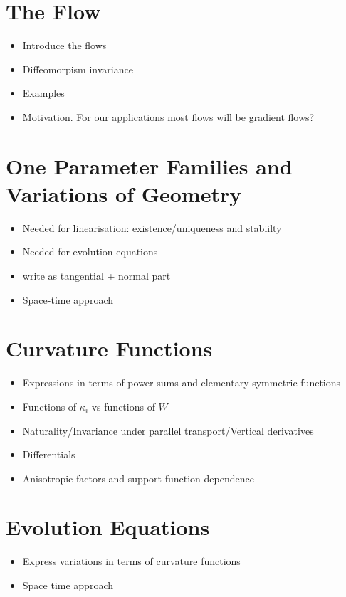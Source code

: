 \chapter{The Flow}

\begin{itemize}
\item Introduce the flows
\item Diffeomorpism invariance
\item Examples
\item Motivation. For our applications most flows will be gradient flows?
\end{itemize}

\chapter{One Parameter Families and Variations of Geometry}

\begin{itemize}
\item Needed for linearisation: existence/uniqueness and stabiilty
\item Needed for evolution equations
\item write as tangential + normal part
\item Space-time approach
\end{itemize}

\chapter{Curvature Functions}

\begin{itemize}
\item Expressions in terms of power sums and elementary symmetric functions
\item Functions of \(\kappa_i\) vs functions of \(W\)
\item Naturality/Invariance under parallel transport/Vertical derivatives
\item Differentials
\item Anisotropic factors and support function dependence
\end{itemize}

\chapter{Evolution Equations}

\begin{itemize}
\item Express variations in terms of curvature functions
\item Space time approach
\end{itemize}

